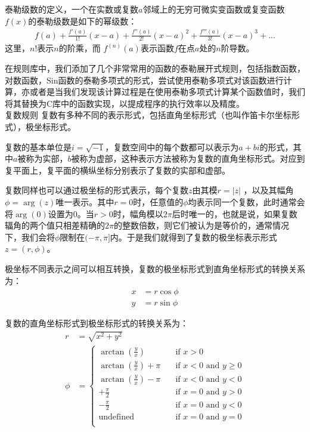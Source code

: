 泰勒级数的定义，一个在实数或复数$a$邻域上的无穷可微实变函数或复变函数$f(x)$的泰勒级数是如下的幂级数：
\begin{gather*}
  f(a)+\frac{f'(a)}{1!}(x-a)+\frac{f''(a)}{2!}(x-a)^2+\frac{f'''(a)}{3!}(x-a)^3+...
\end{gather*}
这里，$n!$表示$n$的阶乘，而 ${f^{(n)}(a)}$表示函数$f$在点$a$处的$n$阶导数。

在规则库中，我们添加了几个非常常用的函数的泰勒展开式规则，包括指数函数，对数函数，Sin函数的泰勒多项式的形式，尝试使用泰勒多项式对该函数进行计算，亦或者是当我们发现该计算过程是在使用泰勒多项式计算某个函数值时，我们将其替换为C库中的函数实现，以提成程序的执行效率以及精度。\\


{\kaishu 复数规则} 复数有多种不同的表示形式，包括直角坐标形式（也叫作笛卡尔坐标形式），极坐标形式。

复数的基本单位是$i=\sqrt{-1}$，复数空间中的每个数都可以表示为$a+bi$的形式，其中$a$被称为实部，$b$被称为虚部，这种表示方法被称为复数的直角坐标形式。对应到复平面上，复平面的横纵坐标分别表示了复数的实部和虚部。

复数同样也可以通过极坐标的形式表示，每个复数$z$由其模$r = |z|$ ，以及其幅角$\phi=\arg(z)$唯一表示。其中$r=0$时，任意值的$\phi$均表示同一个复数，此时通常会将$\arg(0)$设置为$0$。当$r>0$时，幅角模以$2\pi$后时唯一的，也就是说，如果复数辐角的两个值只相差精确的$2\pi$的整数倍数，则它们被认为是等价的，通常情况下，我们会将$\phi$限制在$(-\pi, \pi]$内。于是我们就得到了复数的极坐标表示形式$z =(r, \phi)$。

极坐标不同表示之间可以相互转换，复数的极坐标形式到直角坐标形式的转换关系为：
  \begin{equation*}
    \begin{split}
      x &= r \cos \phi \\
      y &= r \sin \phi
    \end{split}
  \end{equation*}

复数的直角坐标形式到极坐标形式的转换关系为：
  \begin{equation*}
    \begin{split}
      r & = \sqrt{x^2+y^2} \\
      \phi & = 
      \begin{cases}
        \arctan(\frac{y}{x}) & \quad \text{if } x > 0 \\
        \arctan(\frac{y}{x}) + \pi & \quad \text{if } x < 0 \text{ and } y \geq 0 \\
        \arctan(\frac{y}{x}) - \pi & \quad \text{if } x < 0 \text{ and } y < 0 \\
        +\frac{\pi}{2} & \quad \text{if } x = 0 \text{ and } y > 0 \\
        -\frac{\pi}{2} & \quad \text{if } x = 0 \text{ and } y < 0 \\
        \text{undefined} & \quad \text{if } x = 0 \text{ and } y = 0 \\
      \end{cases}  
    \end{split}
  \end{equation*}

